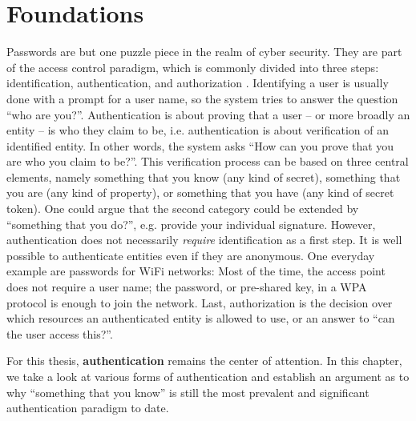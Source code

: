 \chapter[Foundations]{Foundations}\label{chap:rw:passwords}

Passwords are but one puzzle piece in the realm of cyber security. They are part of the access control paradigm, which is commonly divided into three steps: identification, authentication, and authorization \cite{Riley2006IdentityAuthenticationDistinct}. Identifying a user is usually done with a prompt for a user name, so the system tries to answer the question ``who are you?''. Authentication is about proving that a user -- or more broadly an entity -- is who they claim to be, i.e. authentication is about verification of an identified entity. In other words, the system asks ``How can you prove that you are who you claim to be?''. This verification process can be based on three central elements, namely something that you know (any kind of secret), something that you are (any kind of property), or something that you have (any kind of secret token). One could argue that the second category could be extended by ``something that you do?'', e.g. provide your individual signature. However, authentication does not necessarily \textit{require} identification as a first step. It is well possible to authenticate entities even if they are anonymous. One everyday example are passwords for WiFi networks: Most of the time, the access point does not require a user name; the password, or pre-shared key, in a WPA protocol is enough to join the network. 
Last, authorization is the decision over which resources an authenticated entity is allowed to use, or an answer to ``can the user access this?''.


For this thesis, \textbf{authentication} remains the center of attention. In this chapter, we take a look at various forms of authentication and establish an argument as to why ``something that you know'' is still the most prevalent and significant authentication paradigm to date. 

